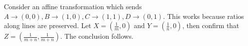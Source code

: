 Consider an affine transformation which sends $A\to\left(0,0\right),B\to\left(1,0\right),C\to\left(1,1\right),D\to\left(0,1\right)$. This works because ratios along lines are preserved. Let $X=\left(\frac{1}{m},0\right)$ and $Y=\left(\frac{1}{n},0\right)$, then confirm that $Z=\left(\frac{1}{m+n},\frac{1}{m+n}\right)$. The conclusion follows.